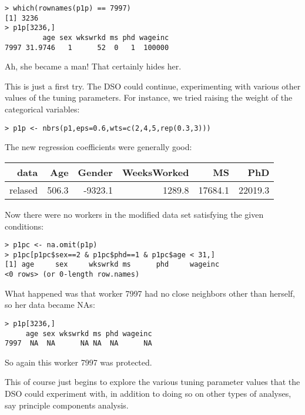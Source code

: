 \documentclass[11pt]{article}
\begin{document}
\begin{lstlisting}
> which(rownames(p1p) == 7997)
[1] 3236
> p1p[3236,]
         age sex wkswrkd ms phd wageinc
7997 31.9746   1      52  0   1  100000
\end{lstlisting}

Ah, she became a man!  That certainly hides her.  

This is just a first try.  The DSO could continue, experimenting with
various other values of the tuning parameters.  For instance,
we tried raising the weight of the categorical variables:


\begin{lstlisting}
> p1p <- nbrs(p1,eps=0.6,wts=c(2,4,5,rep(0.3,3)))
\end{lstlisting}

The new regression coefficients were generally good:

\begin{tabular}{|r|r|r|r|r|r|}
\hline
data & Age & Gender & WeeksWorked & MS & PhD \\ \hline 
relased & 506.3  & -9323.1  & 1289.8 & 17684.1 & 22019.3 \\ \hline 
\end{tabular}

Now there were no workers in the modified data set satisfying
the given conditions: 

\begin{lstlisting}
> p1pc <- na.omit(p1p) 
> p1pc[p1pc$sex==2 & p1pc$phd==1 & p1pc$age < 31,]
[1] age     sex     wkswrkd ms      phd     wageinc
<0 rows> (or 0-length row.names)
\end{lstlisting}

What happened was that worker 7997 had no close neighbors other than
herself, so her data became NAs:

\begin{lstlisting}
> p1p[3236,]
     age sex wkswrkd ms phd wageinc
7997  NA  NA      NA NA  NA      NA
\end{lstlisting}

So again this worker 7997 was protected.

This of course just begins to explore the various tuning
parameter values that the DSO could experiment with, in addition to
doing so on other types of analyses, say principle components analysis.
\end{document}
